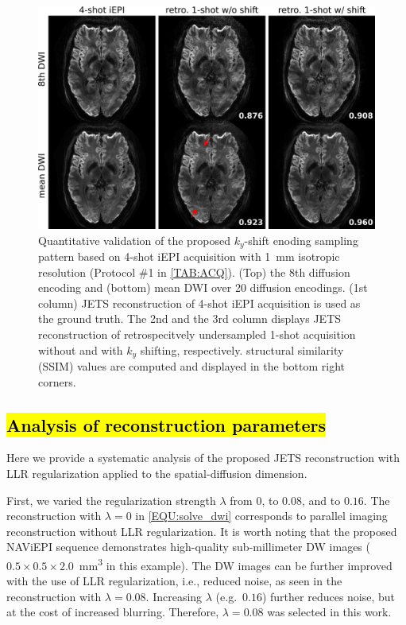 \documentclass[preprint,12pt,authoryear,review]{elsarticle}
\begin{document}
    \begin{figure}
        \centering
        \includegraphics[width=\textwidth]{../figures/fig4.png}
        \caption{Quantitative validation of the proposed
        $k_y$-shift enoding sampling pattern
        based on 4-shot iEPI acquisition with 1~mm isotropic resolution
        (Protocol \#1 in \cref{TAB:ACQ}).
        (Top) the 8th diffusion encoding and
        (bottom) mean DWI over 20 diffusion encodings.
        (1st column) JETS reconstruction of 4-shot iEPI acquisition
        is used as the ground truth.
        The 2nd and the 3rd column displays JETS reconstruction
        of retrospecitvely undersampled
        1-shot acquisition without and with $k_y$ shifting,
        respectively.
        structural similarity (SSIM) values are computed and
        displayed in the bottom right corners.}
        \label{FIG:retro}
    \end{figure}


    \subsection{\hl{Analysis of reconstruction parameters}}

    Here we provide a systematic analysis of
    the proposed JETS reconstruction
    with LLR regularization applied to
    the spatial-diffusion dimension.

    First, we varied the regularization strength $\lambda$
    from $0$, to $0.08$, and to $0.16$.
    The reconstruction with $\lambda = 0$ in \cref{EQU:solve_dwi}
    corresponds to parallel imaging reconstruction
    without LLR regularization.
    It is worth noting that the proposed NAViEPI sequence
    demonstrates high-quality sub-millimeter DW images
    ($0.5\times0.5\times2.0$~\si{\cubic\mm} in this example).
    The DW images can be further improved
    with the use of LLR regularization, i.e., reduced noise,
    as seen in the reconstruction with $\lambda=0.08$.
    Increasing $\lambda$ (e.g.~$0.16$) further reduces noise,
    but at the cost of increased blurring.
    Therefore, $\lambda=0.08$ was selected in this work.
\end{document}
